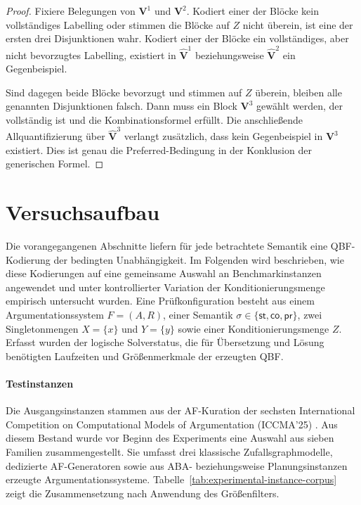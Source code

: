 \begin{proof}
    Fixiere Belegungen von \(\mathbf V^1\) und \(\mathbf V^2\). Kodiert
    einer der Blöcke kein vollständiges Labelling oder stimmen die Blöcke
    auf \(Z\) nicht überein, ist eine der ersten drei Disjunktionen wahr.
    Kodiert einer der Blöcke ein vollständiges, aber nicht bevorzugtes
    Labelling, existiert in
    \(\widehat{\mathbf V}^{1}\) beziehungsweise
    \(\widehat{\mathbf V}^{2}\) ein Gegenbeispiel.

    Sind dagegen beide Blöcke bevorzugt und stimmen auf \(Z\) überein,
    bleiben alle genannten Disjunktionen falsch. Dann muss ein Block
    \(\mathbf V^3\) gewählt werden, der vollständig ist und die
    Kombinationsformel erfüllt. Die anschließende Allquantifizierung über
    \(\widehat{\mathbf V}^{3}\) verlangt zusätzlich, dass kein
    Gegenbeispiel in \(\mathbf V^3\) existiert. Dies ist genau die
    Preferred-Bedingung in der Konklusion der generischen Formel.
\end{proof}
\fi

\section{Versuchsaufbau}
\label{sec:experimental-setup}

Die vorangegangenen Abschnitte liefern für jede betrachtete Semantik eine
QBF-Kodierung der bedingten Unabhängigkeit. Im Folgenden wird beschrieben, wie diese
Kodierungen auf eine gemeinsame Auswahl an Benchmarkinstanzen angewendet und unter
kontrollierter Variation der Konditionierungsmenge empirisch untersucht
wurden. Eine Prüfkonfiguration besteht aus einem Argumentationssystem
\(F=(A,R)\), einer Semantik
\(\sigma\in\{\mathsf{st},\mathsf{co},\mathsf{pr}\}\), zwei
Singletonmengen \(X=\{x\}\) und \(Y=\{y\}\) sowie einer
Konditionierungsmenge \(Z\). Erfasst wurden der logische Solverstatus, die
für Übersetzung und Lösung benötigten Laufzeiten und Größenmerkmale der
erzeugten QBF.

\paragraph{Testinstanzen}
Die Ausgangsinstanzen stammen aus der AF-Kuration der sechsten
International Competition on Computational Models of Argumentation
(ICCMA'25) \cite{apostolakis:2025:iccma-instances}. Aus diesem Bestand
wurde vor Beginn des Experiments eine Auswahl aus sieben Familien
zusammengestellt. Sie umfasst drei klassische Zufallsgraphmodelle,
dedizierte AF-Generatoren sowie aus ABA- beziehungsweise Planungsinstanzen
erzeugte Argumentationssysteme. Tabelle~\ref{tab:experimental-instance-corpus}
zeigt die Zusammensetzung nach Anwendung des Größenfilters.

